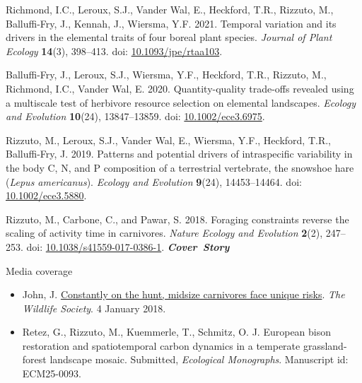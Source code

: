 \begin{etaremune}[topsep=0pt,itemsep=1pt,partopsep=0pt,parsep=0pt]
  \item Richmond, I.C., Leroux, S.J., Vander Wal, E., Heckford, T.R., \textcolor{awesome}{Rizzuto, M.}, Balluffi-Fry, J., Kennah, J., Wiersma, Y.F. 2021. Temporal variation and its drivers in the elemental traits of four boreal plant species. \emph{Journal of Plant Ecology} \textbf{14}(3), 398--413. doi: \href{https://doi.org/10.1093/jpe/rtaa103}{10.1093/jpe/rtaa103}.
  \item Balluffi-Fry, J., Leroux, S.J., Wiersma, Y.F., Heckford, T.R., \textcolor{awesome}{Rizzuto, M.}, Richmond, I.C., Vander Wal, E. 2020. Quantity-quality trade-offs revealed using a multiscale test of herbivore resource selection on elemental landscapes. \emph{Ecology and Evolution} \textbf{10}(24), 13847--13859. doi: \href{https://doi.org/10.1002/ece3.6975}{10.1002/ece3.6975}.
  \item \textcolor{awesome}{Rizzuto, M.}, Leroux, S.J., Vander Wal, E., Wiersma, Y.F., Heckford, T.R., Balluffi-Fry, J. 2019. Patterns and potential drivers of intraspecific variability in the body C, N, and P composition of a terrestrial vertebrate, the snowshoe hare (\textit{Lepus americanus}). \textit{Ecology and Evolution} \textbf{9}(24), 14453--14464. doi: \href{https://doi.org/10.1002/ece3.5880}{10.1002/ece3.5880}.
  \item \textcolor{awesome}{Rizzuto, M.}, Carbone, C., and Pawar, S. 2018. Foraging constraints reverse the scaling of activity time in carnivores. \emph{Nature Ecology and Evolution} \textbf{2}(2), 247--253. doi: \href{https://doi.org/10.1038/s41559-017-0386-1}{10.1038/s41559-017-0386-1}. \null\hfill\textbf{\textit{Cover~Story}}
  \begin{description}
    \item[\bodyfontlight Media coverage]
  \end{description}
  \begin{itemize}
      \item John, J. \href{https://wildlife.org/constantly-on-the-hunt-midsize-carnivores-face-unique-risks/}{Constantly on the hunt, midsize carnivores face unique risks}. \emph{The Wildlife Society}. 4 January 2018.
  \end{itemize}
\end{etaremune}

\begin{itemize}[noitemsep]
  \item Retez, G.\textsuperscript{\textdagger}, \textcolor{awesome}{Rizzuto, M.}\textsuperscript{\textdagger}, Kuemmerle, T., Schmitz, O. J. European bison restoration and spatiotemporal carbon dynamics in a temperate grassland-forest landscape mosaic. Submitted, \emph{Ecological Monographs}. Manuscript id: ECM25-0093.
\end{itemize}

